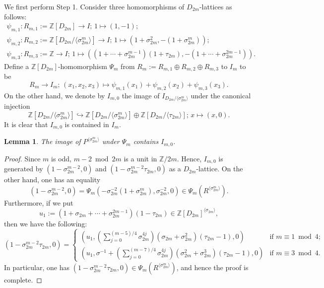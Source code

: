 \documentclass[12pt]{amsart}
\theoremstyle{plain}
\newtheorem{lem}[thm]{Lemma}
\theoremstyle{definition}
\numberwithin{thm}{section}
\numberwithin{equation}{section}
\newcommand{\Z}{\mathbb{Z}}
\begin{document}
We first perform Step 1. Consider three homomorphisms of $D_{2m}$-lattices as follows: 
\begin{gather*}
\psi_{m,1}\colon R_{m,1}:=\Z[D_{2m}]\rightarrow I;\,1\mapsto (1,-1);\\
\psi_{m,2}\colon R_{m,2}:=\Z[D_{2m}/\langle \sigma_{2m}^{m}\rangle]\rightarrow I;\,1\mapsto (1+\sigma_{2m}^{2},-(1+\sigma_{2m}^{m}));\\
\psi_{m,3}\colon R_{m,3}:=\Z \rightarrow I;\,1\mapsto ((1+\cdots+\sigma_{2m}^{m-1})(1+\tau_{2m}),-(1+\cdots+\sigma_{2m}^{2m-1})). 
\end{gather*}
Define a $\Z[D_{2m}]$-homomorphism $\Psi_{m}$ from $R_{m}:=R_{m,1}\oplus R_{m,2} \oplus R_{m,3}$ to $I_{m}$ to be
\begin{equation*}
R_{m} \rightarrow I_{m};\,(x_{1},x_{2},x_{3})\mapsto \psi_{m,1}(x_{1})+\psi_{m,2}(x_{2})+\psi_{m,3}(x_{3}). 
\end{equation*}
On the other hand, we denote by $I_{m,0}$ the image of $I_{D_{2m}/\langle \sigma_{2m}^{m}\rangle}$ under the canonical injection
\begin{equation*}
\Z[D_{2m}/\langle \sigma_{2m}^{m}\rangle] \hookrightarrow \Z[D_{2m}/\langle \sigma_{2m}^{m}\rangle] \oplus \Z[D_{2m}/\langle \tau_{2m}\rangle];\,x\mapsto (x,0). 
\end{equation*}
It is clear that $I_{m,0}$ is contained in $I_{m}$. 

\begin{lem}\label{lem:zfsj}
The image of $P^{\langle \sigma_{2m}^{m}\rangle}$ under $\Psi_{m}$ contains $I_{m,0}$. 
\end{lem}

\begin{proof}
Since $m$ is odd, $m-2\bmod 2m$ is a unit in $\Z/2m$. Hence, $I_{m,0}$ is generated by $(1-\sigma_{2m}^{m-2},0)$ and $(1-\sigma_{2m}^{m-2}\tau_{2m},0)$ as a $D_{2m}$-lattice. On the other hand, one has an equality
\begin{equation*}
(1-\sigma_{2m}^{m-2},0)=\Psi_{m}(-\sigma_{2m}^{-2}(1+\sigma_{2m}^{m}),\sigma_{2m}^{-2},0)\in \Psi_{m}(R^{\langle \sigma_{2m}^{m}\rangle}). 
\end{equation*}
Furthermore, if we put 
\begin{equation*}
u_{1}:=(1+\sigma_{2m}+\cdots+\sigma_{2m}^{2m-1})(1-\tau_{2m})\in \Z[D_{2m}]^{\langle \sigma_{2m}\rangle}, 
\end{equation*}
then we have the following: 
\begin{equation*}
(1-\sigma_{2m}^{m-2}\tau_{2m},0)=
\begin{cases}
\left(u_{1},\left(\sum_{j=0}^{(m-5)/4}\sigma_{2m}^{4j}\right)(\sigma_{2m}+\sigma_{2m}^{2})(\tau_{2m}-1),0\right)&\text{if }m\equiv 1 \bmod 4;\\
\left(u_{1},\sigma^{-1}+\left(\sum_{j=0}^{(m-7)/4}\sigma_{2m}^{4j}\right)(\sigma_{2m}^{2}+\sigma_{2m}^{3})(\tau_{2m}-1),0\right)&\text{if }m\equiv 3 \bmod 4. 
\end{cases}
\end{equation*}
In particular, one has $(1-\sigma_{2m}^{m-2}\tau_{2m},0)\in \Psi_{m}(R^{\langle \sigma_{2m}^{m}\rangle})$, and hence the proof is complete. 
\end{proof}
\end{document}
